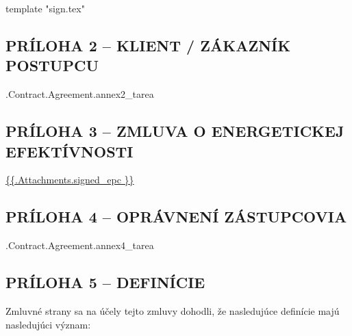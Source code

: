 \documentclass[a4paper]{article}
\begin{document}
{{template "sign.tex"}}

\subsection{PRÍLOHA 2 – KLIENT / ZÁKAZNÍK POSTUPCU}

\iffalse input forfaitingFields.annex2_tarea value="{{.Contract.Agreement.annex2_tarea}}" type="textarea" \fi {{.Contract.Agreement.annex2_tarea}}

\pagebreak

\subsection{PRÍLOHA 3 – ZMLUVA O ENERGETICKEJ EFEKTÍVNOSTI}

\url{ {{.Attachments.signed_epc }} }

\iffalse attachment value="signed epc" \fi

\pagebreak

\subsection{PRÍLOHA 4 – OPRÁVNENÍ ZÁSTUPCOVIA}

\iffalse input forfaitingFields.annex4_tarea value="{{.Contract.Agreement.annex4_tarea}}" type="textarea" \fi {{.Contract.Agreement.annex4_tarea}}

\pagebreak

\subsection{PRÍLOHA 5 – DEFINÍCIE}


\renewcommand*{\theenumi}{\roman{enumi}}

Zmluvné strany sa na účely tejto zmluvy dohodli, že nasledujúce definície majú nasledujúci význam: \par
\end{document}
